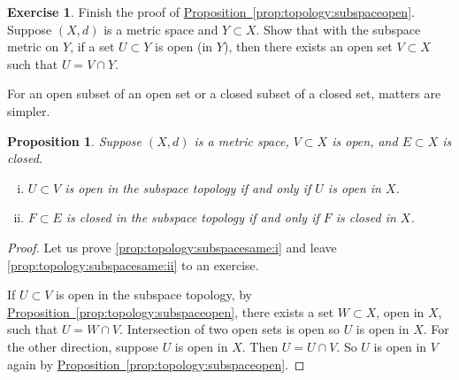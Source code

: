 \documentclass[12pt,openany]{book}
\theoremstyle{plain}
\newtheorem{prop}[thm]{Proposition}
\theoremstyle{remark}
\theoremstyle{definition}
\newenvironment{exbox}{%
    \def\FrameCommand{\vrule width 1pt \relax\hspace{10pt}}%
    \MakeFramed{\advance\hsize-\width\FrameRestore}%
}{%
    \endMakeFramed
}
\theoremstyle{exercise}
\newtheorem{exercise}{Exercise}[section]
\theoremstyle{example}
\newcommand{\propref}[1]{\hyperref[#1]{Proposition~\ref*{#1}}}
\begin{document}
\begin{exbox}
\begin{exercise}
Finish the proof of \propref{prop:topology:subspaceopen}.
Suppose $(X,d)$ is a metric space and $Y \subset X$.  Show that
with the subspace metric on $Y$, if a set $U \subset Y$
is open (in $Y$), then there exists an open set $V \subset X$ such
that $U = V \cap Y$.
\end{exercise}
\end{exbox}

For an open subset of an open set or a closed subset of a closed
set, matters are simpler.

\begin{prop} \label{prop:topology:subspacesame}
Suppose $(X,d)$ is a metric space, $V \subset X$ is open,
and $E \subset X$ is closed.
\begin{enumerate}[(i)]
\item \label{prop:topology:subspacesame:i}
$U \subset V$ is open in the subspace topology if and only if $U$ is open
in $X$.
\item \label{prop:topology:subspacesame:ii}
$F \subset E$ is closed in the subspace topology if and only if $F$ is
closed in $X$.
\end{enumerate}
\end{prop}

\begin{proof}
Let us prove
\ref{prop:topology:subspacesame:i}
and leave 
\ref{prop:topology:subspacesame:ii} to an exercise.

If $U \subset V$ is open in the subspace topology, by
\propref{prop:topology:subspaceopen}, there exists a set $W \subset X$,
open in $X$, such that $U = W \cap V$.  Intersection of two open sets
is open so $U$ is open in $X$.
For the other direction,
suppose $U$ is open in $X$.  Then $U = U \cap V$. So
$U$ is open in $V$ again by \propref{prop:topology:subspaceopen}.
\end{proof}
\end{document}
